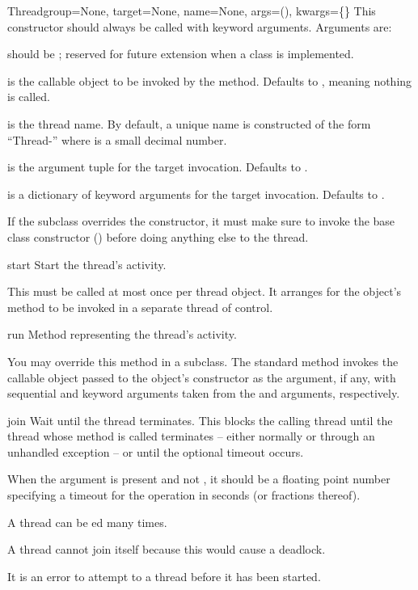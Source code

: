 \begin{classdesc}{Thread}{group=None, target=None, name=None,
                          args=(), kwargs=\{\}}
This constructor should always be called with keyword
arguments.  Arguments are:

 should be ; reserved for future extension when
a  class is implemented.

 is the callable object to be invoked by the
 method.  Defaults to , meaning nothing is
called.

 is the thread name.  By default, a unique name is
constructed of the form ``Thread-'' where  is a small
decimal number.

 is the argument tuple for the target invocation.  Defaults
to \code{()}.

 is a dictionary of keyword arguments for the target
invocation.  Defaults to \code{\{\}}.

If the subclass overrides the constructor, it must make sure
to invoke the base class constructor ()
before doing anything else to the thread.
\end{classdesc}

\begin{methoddesc}{start}{}
Start the thread's activity.

This must be called at most once per thread object.  It
arranges for the object's  method to be invoked in a
separate thread of control.
\end{methoddesc}

\begin{methoddesc}{run}{}
Method representing the thread's activity.

You may override this method in a subclass.  The standard
 method invokes the callable object passed to the object's constructor as the
 argument, if any, with sequential and keyword
arguments taken from the  and  arguments,
respectively.
\end{methoddesc}

\begin{methoddesc}{join}{}
Wait until the thread terminates.
This blocks the calling thread until the thread whose 
method is called terminates -- either normally or through an
unhandled exception -- or until the optional timeout occurs.

When the  argument is present and not , it should
be a floating point number specifying a timeout for the
operation in seconds (or fractions thereof).

A thread can be ed many times.

A thread cannot join itself because this would cause a
deadlock.

It is an error to attempt to  a thread before it has
been started.
\end{methoddesc}


